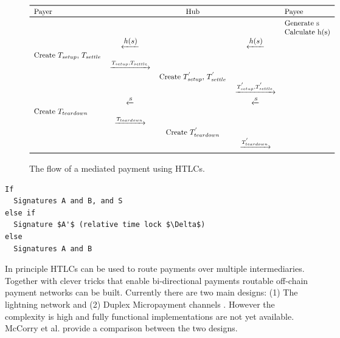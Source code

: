 \documentclass[10pt,journal,compsoc]{IEEEtran}
\begin{document}
\begin{figure}
\centering
\[
\begin{tabular}{lcccl}
\toprule
Payer && Hub && Payee \\
\toprule
&&&& Generate s \\
&&&& Calculate h(s) \\
& $\xleftarrow {\textstyle h(s)}$ && $\xleftarrow {\textstyle h(s)}$ & \\
Create $T_{setup}$, $T_{settle}$ &&&& \\
& $\xrightarrow{T_{setup}, T_{settle}}$ &&& \\
&& Create $T^{'}_{setup}$, $T^{'}_{settle}$ && \\
&&& $\xrightarrow{ T^{'}_{setup},T^{'}_{settle}}$ & \\
& $\xleftarrow {\textstyle s}$  && $\xleftarrow {\textstyle s}$ & \\
Create $T_{teardown}$ &&&& \\
& $\xrightarrow{T_{teardown}}$ &&& \\
&& Create $T^{'}_{teardown}$ && \\
&&& $\xrightarrow{ T^{'}_{teardown}}$ & \\
\bottomrule
\end{tabular}
\]

\caption{The flow of a mediated payment using HTLCs.}
\label{tabl:htlcflow}
\end{figure}


\begin{lstlisting}[mathescape=true,caption={Pseudocode for HTLC output (pubScript)},label={lst:htlc}]
If
  Signatures A and B, and S 
else if
  Signature $A'$ (relative time lock $\Delta$)
else
  Signatures A and B
\end{lstlisting}

In principle HTLCs can be used to route payments over multiple intermediaries. Together with clever tricks that enable bi-directional payments routable off-chain payment networks can be built. Currently there are two main designs: (1) The lightning network \cite{poonbitcoin} and (2) Duplex Micropayment channels \cite{decker2015Duplex}. However the complexity is high and fully functional implementations are not yet available. McCorry et al. \cite{mccorrytowards} provide a comparison between the two designs. 
\end{document}
